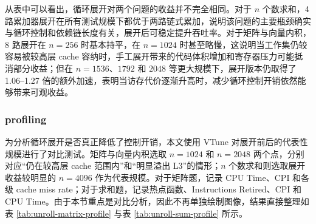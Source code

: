 ﻿\documentclass[UTF8,a4paper,12pt]{ctexart}
\newcommand{\xcompacttablefont}{\fontsize{8.6pt}{9.1pt}\selectfont}
\begin{document}
从表中可以看出，循环展开对两个问题的收益并不完全相同。对于 \(n\) 个数求和，4 路累加器展开在所有测试规模下都优于两路链式累加，说明该问题的主要瓶颈确实与循环控制和依赖链长度有关，展开后可稳定提升吞吐率。对于矩阵与向量内积，8 路展开在 \(n=256\) 时基本持平，在 \(n=1024\) 时甚至略慢，这说明当工作集仍较容易被较高层 cache 容纳时，手工展开带来的代码体积增加和寄存器压力可能抵消部分收益；但在 \(n=1536\)、\(1792\) 和 \(2048\) 等更大规模下，展开版本仍取得了 1.06--1.27 倍的额外加速，表明当访存代价逐渐升高时，减少循环控制开销依然能够带来可观收益。

\subsubsection{profiling}
为分析循环展开是否真正降低了控制开销，本文使用 VTune 对展开前后的代表性规模进行了对比测试。矩阵与向量内积选取 \(n=1024\) 和 \(n=2048\) 两个点，分别对应“仍在较高层 cache 范围内”和“明显溢出 L3”的情形；\(n\) 个数求和则选取展开收益较明显的 \(n=4096\) 作为代表规模。对于矩阵题，记录 CPU Time、CPI 和各级 cache miss rate；对于求和题，记录热点函数、Instructions Retired、CPI 和 CPU Time。由于本节重点是对比分析，因此不再单独绘制图像，结果直接整理如表 \ref{tab:unroll-matrix-profile} 与表 \ref{tab:unroll-sum-profile} 所示。

\begin{table}[H]
    \centering
    \xcompacttablefont
    \setlength{\tabcolsep}{4.0pt}
    \renewcommand{\arraystretch}{1.03}
    \caption{矩阵与向量内积循环展开前后 profiling 对比}
    \label{tab:unroll-matrix-profile}
\end{table}
\end{document}
